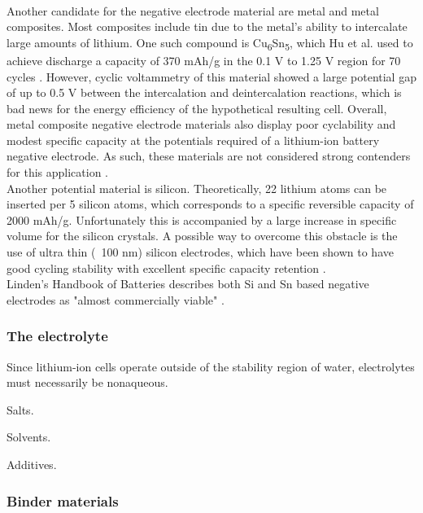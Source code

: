 \documentclass[12pt]{article} %
\begin{document}
\\
Another candidate for the negative electrode material are metal and metal composites.
Most composites include tin due to the metal's ability to intercalate large amounts of lithium.
One such compound is Cu\textsubscript{6}Sn\textsubscript{5}, which Hu et al. used to achieve discharge a capacity of 370 mAh/g in the 0.1 V to 1.25 V region for 70 cycles \cite{hu_cyclic_2009}.
However, cyclic voltammetry of this material showed a large potential gap of up to 0.5 V between the intercalation and deintercalation reactions, which is bad news for the energy efficiency of the hypothetical resulting cell.
Overall, metal composite negative electrode materials also display poor cyclability and modest specific capacity at the potentials required of a lithium-ion battery negative electrode.
As such, these materials are not considered strong contenders for this application \cite{kulova_new_2013}.
\\
Another potential material is silicon.
Theoretically, 22 lithium atoms can be inserted per 5 silicon atoms, which corresponds to a specific reversible capacity of 2000 mAh/g.
Unfortunately this is accompanied by a large increase in specific volume for the silicon crystals.
A possible way to overcome this obstacle is the use of ultra thin (~100 nm) silicon electrodes, which have been shown to have good cycling stability with excellent specific capacity retention \cite{kulova_new_2013}.
\\
Linden's Handbook of Batteries describes both Si and Sn based negative electrodes as "almost commercially viable" \cite{reddy_thomas_section_2011-2}.


\subsubsection{The electrolyte} %

Since lithium-ion cells operate outside of the stability region of water, electrolytes must necessarily be nonaqueous.

\cite{reddy_thomas_section_2011-3}

Salts.

Solvents.

Additives.

\subsubsection{Binder materials} %
\end{document}
